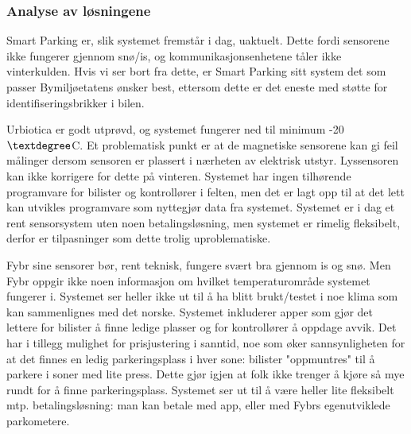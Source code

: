\documentclass[xetex]{beamer}
\begin{document}
\begin{frame}\label{fr:analyse_av_losningene}
	\frametitle{Analyse av løsningene}
	\alert{Smart Parking} er, slik systemet fremstår i dag, \alert{uaktuelt}. Dette fordi sensorene ikke fungerer gjennom snø/is, og kommunikasjonsenhetene tåler ikke vinterkulden. Hvis vi ser bort fra dette, er Smart Parking sitt system det som passer Bymiljøetatens ønsker best, ettersom dette er det eneste med støtte for identifiseringsbrikker i bilen.
	
	\alert{Urbiotica} er godt utprøvd, og systemet fungerer ned til minimum -20$\textdegree$C. Et problematisk punkt er at de magnetiske sensorene kan gi feil målinger dersom sensoren er plassert i nærheten av elektrisk utstyr. Lyssensoren kan ikke korrigere for dette på vinteren. Systemet har ingen tilhørende programvare for bilister og kontrollører i felten, men det er lagt opp til at det lett kan utvikles programvare som nyttegjør data fra systemet. Systemet er i dag et rent sensorsystem uten noen betalingsløsning, men systemet er rimelig fleksibelt, derfor er tilpasninger som dette trolig uproblematiske.
	
	\alert{Fybr} sine sensorer bør, rent teknisk, fungere svært bra gjennom is og snø. Men Fybr oppgir ikke noen informasjon om hvilket temperaturområde systemet fungerer i. Systemet ser heller ikke ut til å ha blitt brukt/testet i noe klima som kan sammenlignes med det norske. Systemet inkluderer apper som gjør det lettere for bilister å finne ledige plasser og for kontrollører å oppdage avvik. Det har i tillegg mulighet for prisjustering i sanntid, noe som øker sannsynligheten for at det finnes en ledig parkeringsplass i hver sone: bilister "oppmuntres" til å parkere i soner med lite press. Dette gjør igjen at folk ikke trenger å kjøre så mye rundt for å finne parkeringsplass. Systemet ser ut til å være heller lite fleksibelt mtp. betalingsløsning: man kan betale med app, eller med Fybrs egenutviklede parkometere.
\end{frame}
\end{document}
